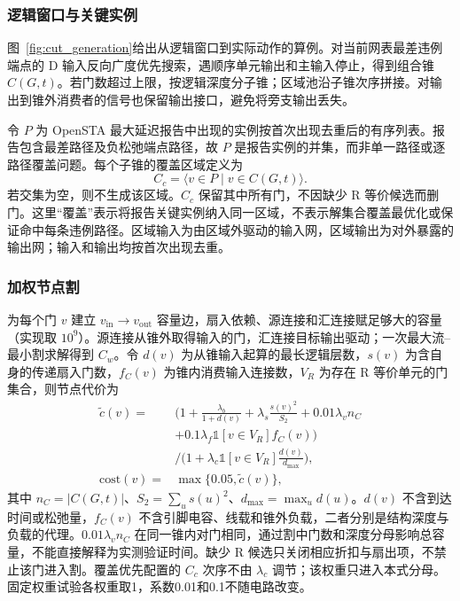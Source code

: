 \documentclass[twocolumn,10pt,fontset=windows]{ctexart}
\begin{document}
\subsubsection{逻辑窗口与关键实例}
图~\ref{fig:cut_generation}给出从逻辑窗口到实际动作的算例。对当前网表最差违例端点的 D 输入反向广度优先搜索，遇顺序单元输出和主输入停止，得到组合锥 $C(G,t)$。若门数超过上限，按逻辑深度分子锥；区域池沿子锥次序拼接。对输出到锥外消费者的信号也保留输出接口，避免将旁支输出丢失。

令 $P$ 为 OpenSTA 最大延迟报告中出现的实例按首次出现去重后的有序列表。报告包含最差路径及负松弛端点路径，故 $P$ 是报告实例的并集，而非单一路径或逐路径覆盖问题。每个子锥的覆盖区域定义为
\begin{equation}\label{eq:cover_region}
C_c=\langle v\in P\mid v\in C(G,t)\rangle.
\end{equation}
若交集为空，则不生成该区域。$C_c$ 保留其中所有门，不因缺少 R 等价候选而删门。这里“覆盖”表示将报告关键实例纳入同一区域，不表示解集合覆盖最优化或保证命中每条违例路径。区域输入为由区域外驱动的输入网，区域输出为对外暴露的输出网；输入和输出均按首次出现去重。

\subsubsection{加权节点割}
为每个门 $v$ 建立 $v_{\mathrm{in}}\!\to v_{\mathrm{out}}$ 容量边，扇入依赖、源连接和汇连接赋足够大的容量（实现取 $10^9$）。源连接从锥外取得输入的门，汇连接目标输出驱动；一次最大流--最小割求解得到 $C_w$。令 $d(v)$ 为从锥输入起算的最长逻辑层数，$s(v)$ 为含自身的传递扇入门数，$f_C(v)$ 为锥内消费输入连接数，$V_R$ 为存在 R 等价单元的门集合，则节点代价为
{\small
\begin{equation}\label{eq:cost}
\begin{aligned}
\widetilde c(v)={}&\Big(1+\frac{\lambda_b}{1+d(v)}
+\lambda_s\frac{s(v)^2}{S_2}+0.01\lambda_v n_C\\
&+0.1\lambda_f\mathbb{1}[v\in V_R]f_C(v)\Big)\\
&\Big/\Big(1+\lambda_c\mathbb{1}[v\in V_R]\frac{d(v)}{d_{\max}}\Big),\\
\mathrm{cost}(v)={}&\max\{0.05,\widetilde c(v)\},
\end{aligned}
\end{equation}
}
其中 $n_C=|C(G,t)|$、$S_2=\sum_u s(u)^2$、$d_{\max}=\max_u d(u)$。$d(v)$ 不含到达时间或松弛量，$f_C(v)$ 不含引脚电容、线载和锥外负载，二者分别是结构深度与负载的代理。$0.01\lambda_v n_C$ 在同一锥内对门相同，通过割中门数和深度分母影响总容量，不能直接解释为实测验证时间。缺少 R 候选只关闭相应折扣与扇出项，不禁止该门进入割。覆盖优先配置的 $C_c$ 次序不由 $\lambda_c$ 调节；该权重只进入本式分母。固定权重试验各权重取1，系数0.01和0.1不随电路改变。
\end{document}
